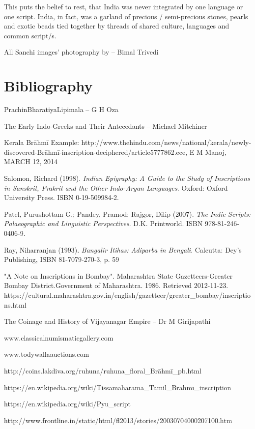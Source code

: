This puts the belief to rest, that India was never integrated by one language or one script. India, in fact, was a garland of precious / semi-precious stones, pearls and exotic beads tied together by threads of shared culture, languages and common script/s.

All Sanchi images’ photography by – Bimal Trivedi


\section*{Bibliography}

\begin{thebibliography}{99}
\item PrachinBharatiyaLipimala – G H Oza

 \item The Early Indo-Greeks and Their Antecedants – Michael Mitchiner

 \item Kerala Brāhmī Example: http://www.thehindu.com/news/national/kerala/newly-discovered-Brāhmī-inscription-deciphered/article5777862.ece, E M Manoj, MARCH 12, 2014

 \item Salomon, Richard (1998). \textit{Indian Epigraphy: A Guide to the Study of Inscriptions in Sanskrit, Prakrit and the Other Indo-Aryan Languages}. Oxford: Oxford University Press. ISBN 0-19-509984-2.

 \item Patel, Purushottam G.; Pandey, Pramod; Rajgor, Dilip (2007). \textit{The Indic Scripts: Palaeographic and Linguistic Perspectives}. D.K. Printworld. ISBN 978-81-246-0406-9.

 \item Ray, Niharranjan (1993). \textit{Bangalir Itihas: Adiparba in Bengali}. Calcutta: Dey's Publishing, ISBN 81-7079-270-3, p. 59

 \item "A Note on Inscriptions in Bombay". Maharashtra State Gazetteers-Greater Bombay District.Government of Maharashtra. 1986. Retrieved 2012-11-23. https://cultural.maharashtra.gov.in/english/gazetteer/greater_bombay/inscriptions.html

 \item The Coinage and History of Vijayanagar Empire – Dr M Girijapathi

 \item www.classicalnumismaticgallery.com

 \item www.todywallaauctions.com

 \item http://coins.lakdiva.org/ruhuna/ruhuna_floral_Brāhmī_pb.html

 \item https://en.wikipedia.org/wiki/Tissamaharama_Tamil_Brāhmī_inscription

 \item https://en.wikipedia.org/wiki/Pyu_script

 \item http://www.frontline.in/static/html/fl2013/stories/20030704000207100.htm

 \end{thebibliography}

